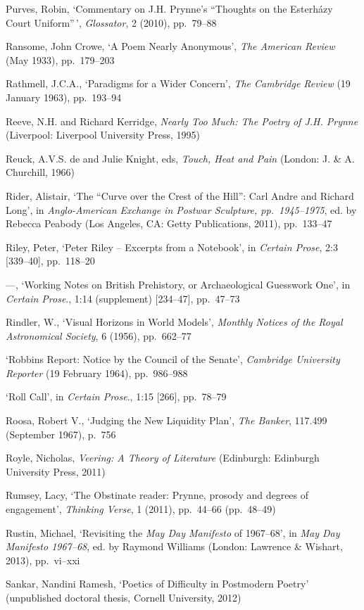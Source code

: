 \documentclass[]{article}
\begin{document}
Purves, Robin, `Commentary on J.H. Prynne's ``Thoughts on the Esterházy
Court Uniform''\,', \emph{Glossator}, 2 (2010), pp.~79--88

Ransome, John Crowe, `A Poem Nearly Anonymous', \emph{The American
Review} (May 1933), pp.~179--203

Rathmell, J.C.A., `Paradigms for a Wider Concern', \emph{The Cambridge
Review} (19 January 1963), pp.~193--94

Reeve, N.H. and Richard Kerridge, \emph{Nearly Too Much: The Poetry of
J.H. Prynne} (Liverpool: Liverpool University Press, 1995)

Reuck, A.V.S. de and Julie Knight, eds, \emph{Touch, Heat and Pain}
(London: J. \& A. Churchill, 1966)

Rider, Alistair, `The ``Curve over the Crest of the Hill'': Carl Andre
and Richard Long', in \emph{Anglo-American Exchange in Postwar
Sculpture, pp.~1945--1975}, ed. by Rebecca Peabody (Los Angeles, CA:
Getty Publications, 2011), pp.~133--47

Riley, Peter, `Peter Riley -- Excerpts from a Notebook', in
\emph{Certain Prose}, 2:3 {[}339--40{]}, pp.~118--20

---, `Working Notes on British Prehistory, or Archaeological Guesswork
One', in \emph{Certain Prose}., 1:14 (supplement) {[}234--47{]},
pp.~47--73

Rindler, W., `Visual Horizons in World Models', \emph{Monthly Notices of
the Royal Astronomical Society}, 6 (1956), pp.~662--77

`Robbins Report: Notice by the Council of the Senate', \emph{Cambridge
University Reporter} (19 February 1964), pp.~986--988

`Roll Call', in \emph{Certain Prose}., 1:15 {[}266{]}, pp.~78--79

Roosa, Robert V., `Judging the New Liquidity Plan', \emph{The Banker},
117.499 (September 1967), p.~756

Royle, Nicholas, \emph{Veering: A Theory of Literature} (Edinburgh:
Edinburgh University Press, 2011)

Rumsey, Lacy, `The Obstinate reader: Prynne, prosody and degrees of
engagement', \emph{Thinking Verse}, 1 (2011), pp.~44--66 (pp.~48--49)

Rustin, Michael, `Revisiting the \emph{May Day Manifesto} of 1967--68',
in \emph{May Day Manifesto 1967--68}, ed. by Raymond Williams (London:
Lawrence \& Wishart, 2013), pp.~vi--xxi

Sankar, Nandini Ramesh, `Poetics of Difficulty in Postmodern Poetry'
(unpublished doctoral thesis, Cornell University, 2012)
\end{document}
